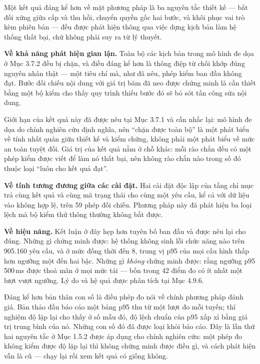 Một kết quả đáng kể hơn về mặt phương pháp là ba nguyên tắc thiết kế --- bất đối xứng giữa cấp và thu hồi, chuyển quyền gốc hai bước, và khôi phục vai trò kèm phiên bản --- đều được phát hiện thông qua việc dựng kịch bản làm hệ thống thất bại, chứ không phải suy ra từ lý thuyết.

\textbf{Về khả năng phát hiện gian lận.} Toàn bộ các kịch bản trong mô hình đe dọa ở Mục 3.7.2 đều bị chặn, và điều đáng kể hơn là thông điệp từ chối khớp đúng nguyên nhân thật --- một tiêu chí mà, như đã nêu, phép kiểm ban đầu không đạt. Bước đối chiếu nội dung với giá trị băm đã neo được chứng minh là cần thiết bằng một bộ kiểm cho thấy quy trình thiếu bước đó sẽ bỏ sót tấn công sửa nội dung.

Giới hạn của kết quả này đã được nêu tại Mục 3.7.1 và cần nhắc lại: mô hình đe dọa do chính nghiên cứu định nghĩa, nên {``}chặn được toàn bộ{''} là một phát biểu về tính nhất quán giữa thiết kế và kiểm chứng, không phải một phát biểu về mức an toàn tuyệt đối. Giá trị của kết quả nằm ở chỗ khác: mỗi rào chắn đều có một phép kiểm được viết để làm nó thất bại, nên không rào chắn nào trong số đó thuộc loại {``}luôn cho kết quả đạt{''}.

\textbf{Về tính tương đương giữa các cài đặt.} Hai cài đặt độc lập của tầng chỉ mục trả cùng kết quả và cùng mã trạng thái cho cùng một yêu cầu, kể cả với dữ liệu vào không hợp lệ, trên 59 phép đối chiếu. Phương pháp này đã phát hiện ba loại lệch mà bộ kiểm thử thông thường không bắt được.

\textbf{Về hiệu năng.} Kết luận ở đây hẹp hơn tuyên bố ban đầu và được nêu lại cho đúng. Những gì chứng minh được: hệ thống không sinh lỗi chức năng nào trên 905.160 yêu cầu, và ở mức đồng thời đến 8, trung vị p95 của mọi cấu hình thấp hơn ngưỡng một đến hai bậc. Những gì \emph{không} chứng minh được: rằng ngưỡng p95 500\,ms được thoả mãn ở mọi mức tải --- bốn trong 42 điểm đo có ít nhất một lượt vượt ngưỡng. Lý do và hệ quả được phân tích tại Mục 4.9.6.

Đáng kể hơn bản thân con số là điều phép đo nói về chính phương pháp đánh giá. Bản thảo đầu báo cáo một bảng p95 thu từ một lượt đo mỗi tuyến; thí nghiệm độ lặp lại cho thấy ở số mẫu đó, độ lệch chuẩn của p95 xấp xỉ bằng giá trị trung bình của nó. Những con số đó đã được loại khỏi báo cáo. Đây là lần thứ hai nguyên tắc ở Mục 1.5.2 được áp dụng cho chính nghiên cứu: một phép đo không kiểm được độ lặp lại thì không chứng minh được điều gì, và cách phát hiện vẫn là cũ --- chạy lại rồi xem kết quả có giống không.

